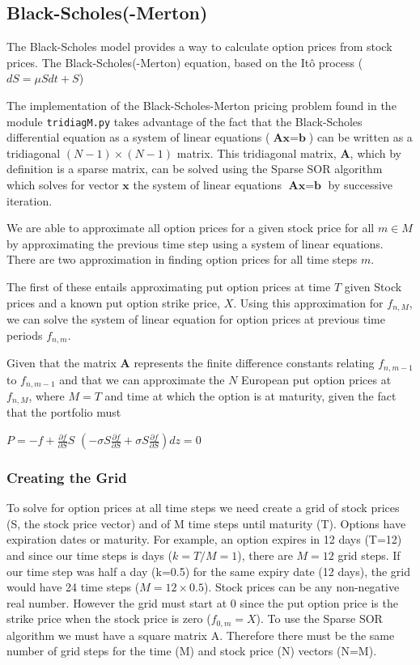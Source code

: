 \documentclass[paper=a4, fontsize=10pt]{scrartcl} %
\begin{document}
\subsection {Black-Scholes(-Merton)}

The Black-Scholes model provides a way to calculate option prices from stock prices. The Black-Scholes(-Merton) equation, based on the It\^{o} process ($dS = \mu S dt+ S$)

The implementation of the Black-Scholes-Merton pricing problem found in the module \texttt{tridiagM.py} takes advantage of the fact that the Black-Scholes differential equation as a system of linear equations ($\textbf{A}\textbf{x} = \textbf{b}$) can be written as a tridiagonal $(N-1)\times(N-1)$ matrix. This tridiagonal matrix, $\textbf{A}$, which by definition is a sparse matrix, can be solved using the Sparse SOR algorithm
 which solves for vector $\textbf{x}$ the system of linear equations $\textbf{A}\textbf{x} = \textbf{b}$ by successive iteration. 

We are able to approximate all option prices for a given stock price for all $m \in M$ by approximating the previous time step using a system of linear equations. There are two approximation in finding option prices for all time steps $m$. 

The first of these entails approximating put option prices at time $T$ given Stock prices and a known put option strike price, $X$. Using this approximation for $f_{n,M}$, we can solve the system of linear equation for option prices at previous time periods $f_{n,m}$.

Given that the matrix $\textbf{A}$ represents the finite difference constants relating $f_{n, m-1}$ to $f_{n, m-1}$ and that we can approximate the $N$ European put option prices at $f_{n,M}$, where $M=T$ and time at which the option is at maturity, given the fact that the portfolio must 

$P = -f + \frac{\partial{f}}{\partial{S}}S$
$\left( -\sigma S \frac{\partial{f}}{\partial{S}} +\sigma S \frac{\partial{f}}{\partial{S}} \right) dz = 0 $

 
\subsubsection{Creating the Grid}
To solve for option prices at all time steps we need create a grid of stock prices (S, the stock price vector) and of M time steps until maturity (T).
Options have expiration dates or maturity. For example, an option expires in 12 days (T=12) and since our time steps is days ($k=T/M=1$), there are $M=12$ grid steps. If our time step was half a day (k=0.5) for the same expiry date (12 days), the grid would have 24 time steps ($M = 12 \times 0.5$).
Stock prices can be any non-negative real number. However the grid must start at 0 since the put option price is the strike price when the stock price is zero ($f_{0,m} = X$). To use the Sparse SOR algorithm we must have a square matrix A. Therefore there must be the same number of grid steps for the time (M) and stock price (N) vectors (N=M).
\end{document}
